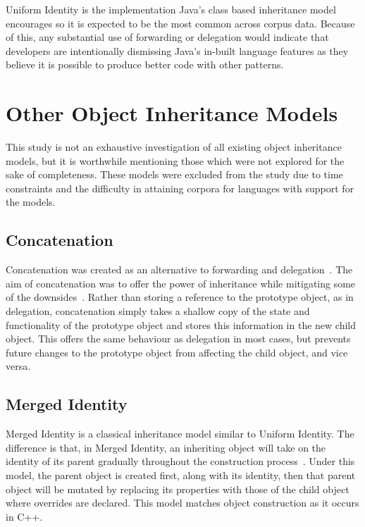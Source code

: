 Uniform Identity is the implementation Java's class based inheritance model encourages so it is expected to be the most common across corpus data. Because of this, any substantial use of forwarding or delegation would indicate that developers are intentionally dismissing Java's in-built language features as they believe it is possible to produce better code with other patterns.

\section{Other Object Inheritance Models}
This study is not an exhaustive investigation of all existing object inheritance models, but it is worthwhile mentioning those which were not explored for the sake of completeness. These models were excluded from the study due to time constraints and the difficulty in attaining corpora for languages with support for the models.

\subsection{Concatenation}
Concatenation was created as an alternative to forwarding and delegation~\cite{InheritanceWithoutClasses}. The aim of concatenation was to offer the power of inheritance while mitigating some of the downsides~\cite{Concatenation}. Rather than storing a reference to the prototype object, as in delegation, concatenation simply takes a shallow copy of the state and functionality of the prototype object and stores this information in the new child object. This offers the same behaviour as delegation in most cases, but prevents future changes to the prototype object from affecting the child object, and vice versa.

\subsection{Merged Identity}
Merged Identity is a classical inheritance model similar to Uniform Identity. The difference is that, in Merged Identity, an inheriting object will take on the identity of its parent gradually throughout the construction process~\cite{InheritanceWithoutClasses}. Under this model, the parent object is created first, along with its identity, then that parent object will be mutated by replacing its properties with those of the child object where overrides are declared. This model matches object construction as it occurs in C++.
